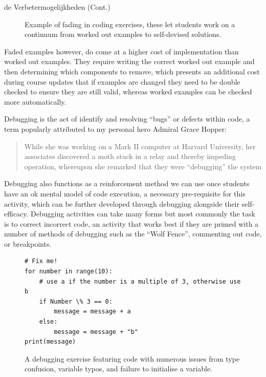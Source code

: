 \documentclass[final]{beamer}
\newlength{\colwidth}
\begin{document}
\begin{frame}[t,fragile]
\begin{columns}[t]
\begin{column}{\colwidth}
\begin{block}{de Verbetermogelijkheden (Cont.)}
\begin{figure}[ht]
  \caption{Example of fading in coding exercises, these let students work on a continuum from worked out examples to self-devised solutions.\label{fig:fade}}
\end{figure}

Faded examples however, do come at a higher cost of implementation than worked out examples\cite{Zamary_2018}. They require writing the correct worked out example and then determining which components to remove, which presents an additional cost during course updates that if examples are changed they need to be double checked to ensure they are still valid, whereas worked examples can be checked more automatically.


        Debugging is the act of identify and resolving ``bugs'' or defects within code, a term popularly attributed to my personal hero Admiral Grace Hopper:

        \begin{quote}
            While she was working on a Mark II computer at Harvard University, her associates discovered a moth stuck in a relay and thereby impeding operation, whereupon she remarked that they were ``debugging'' the system\cite{enwiki:1069955193}
        \end{quote}

      Debugging also functions as a reinforcement method we can use once students have an ok mental model of code execution, a necessary pre-requisite for this activity, which can be further developed through debugging\cite{Ramalingam_2004} alongside their self-efficacy\cite{Michaeli_2019}. Debugging activities can take many forms but most commonly the task is to correct incorrect code, an activity that works best if they are primed with a number of methods of debugging\cite{Murphy_2008} such as the ``Wolf Fence''\cite{Gauss_1982}, commenting out code, or breakpoints.

      \begin{figure}[]
\begin{lstlisting}
# Fix me!
for number in range(10):
    # use a if the number is a multiple of 3, otherwise use b
    if Number \% 3 == 0:
        message = message + a
    else:
        message = message + "b"
print(message)
\end{lstlisting}
          \caption{A debugging exercise featuring code with numerous issues from type confusion, variable typos, and failure to initialise a variable.\label{fig:debug}}
      \end{figure}
  \end{block}




\end{column}
\end{columns}
\end{frame}
\end{document}
